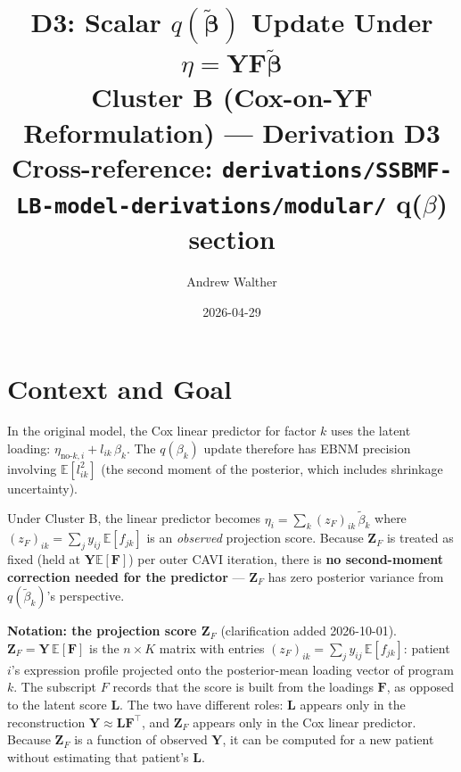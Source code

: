 \documentclass[11pt]{article}
\title{\textbf{D3: Scalar $q(\tilde{\boldsymbol{\beta}})$ Update Under $\eta = \mathbf{Y}\mathbf{F}\tilde{\boldsymbol{\beta}}$}\\[4pt]
\large Cluster B (Cox-on-YF Reformulation) — Derivation D3\\[2pt]
\normalsize Cross-reference: \texttt{derivations/SSBMF-LB-model-derivations/modular/} q($\beta$) section}
\author{Andrew Walther}
\date{2026-04-29}
\newcommand{\E}{\mathbb{E}}
\begin{document}
\maketitle
\tableofcontents
\newpage

\section{Context and Goal}

In the original model, the Cox linear predictor for factor $k$ uses the latent loading:
$\eta_{\text{no-}k,i} + l_{ik}\,\beta_k$. The $q(\beta_k)$ update therefore has EBNM
precision involving $\E[l_{ik}^2]$ (the second moment of the posterior, which includes
shrinkage uncertainty).

\bigskip
Under Cluster B, the linear predictor becomes $\eta_i = \sum_k (z_F)_{ik}\,\tilde\beta_k$
where $(z_F)_{ik} = \sum_j y_{ij}\,\E[f_{jk}]$ is an \emph{observed} projection score.
Because $\mathbf{Z}_F$ is treated as fixed (held at $\mathbf{Y}\E[\mathbf{F}]$) per outer
CAVI iteration, there is \textbf{no second-moment correction needed for the predictor} —
$\mathbf{Z}_F$ has zero posterior variance from $q(\tilde\beta_k)$'s perspective.

\bigskip
\textbf{Notation: the projection score $\mathbf{Z}_F$} (clarification added 2026-10-01).
$\mathbf{Z}_F = \mathbf{Y}\,\E[\mathbf{F}]$ is the $n\times K$ matrix with entries
$(z_F)_{ik} = \sum_j y_{ij}\,\E[f_{jk}]$: patient $i$'s expression profile projected onto
the posterior-mean loading vector of program $k$. The subscript $F$ records that the score
is built from the loadings $\mathbf{F}$, as opposed to the latent score $\mathbf{L}$.
The two have different roles: $\mathbf{L}$ appears only in the reconstruction
$\mathbf{Y}\approx\mathbf{L}\mathbf{F}^\top$, and $\mathbf{Z}_F$ appears only in the Cox
linear predictor. Because $\mathbf{Z}_F$ is a function of observed $\mathbf{Y}$, it can be
computed for a new patient without estimating that patient's $\mathbf{L}$.
\end{document}
